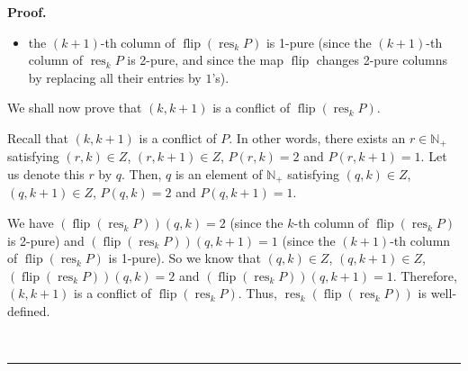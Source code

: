 \documentclass[numbers=enddot,12pt,final,onecolumn,notitlepage]{scrartcl}%
\theoremstyle{definition}
\newenvironment{proof}[1][Proof]{\noindent\textbf{#1.} }{\ \rule{0.5em}{0.5em}}
\newenvironment{verlong}{}{}
\begin{document}
\begin{verlong}
\begin{proof}
\begin{itemize}
\item the $\left(  k+1\right)  $-th column of $\operatorname*{flip}\left(
\operatorname*{res}\nolimits_{k}P\right)  $ is 1-pure (since the $\left(
k+1\right)  $-th column of $\operatorname*{res}\nolimits_{k}P$ is 2-pure, and
since the map $\operatorname*{flip}$ changes 2-pure columns by replacing all
their entries by $1$'s).
\end{itemize}

We shall now prove that $\left(  k,k+1\right)  $ is a conflict of
$\operatorname*{flip}\left(  \operatorname*{res}\nolimits_{k}P\right)  $.

Recall that $\left(  k,k+1\right)  $ is a conflict of $P$. In other words,
there exists an $r\in\mathbb{N}_{+}$ satisfying $\left(  r,k\right)  \in Z$,
$\left(  r,k+1\right)  \in Z$, $P\left(  r,k\right)  =2$ and $P\left(
r,k+1\right)  =1$. Let us denote this $r$ by $q$. Then, $q$ is an element of
$\mathbb{N}_{+}$ satisfying $\left(  q,k\right)  \in Z$, $\left(
q,k+1\right)  \in Z$, $P\left(  q,k\right)  =2$ and $P\left(  q,k+1\right)
=1$.

We have $\left(  \operatorname*{flip}\left(  \operatorname*{res}%
\nolimits_{k}P\right)  \right)  \left(  q,k\right)  =2$ (since the $k$-th
column of $\operatorname*{flip}\left(  \operatorname*{res}\nolimits_{k}%
P\right)  $ is 2-pure) and $\left(  \operatorname*{flip}\left(
\operatorname*{res}\nolimits_{k}P\right)  \right)  \left(  q,k+1\right)  =1$
(since the $\left(  k+1\right)  $-th column of $\operatorname*{flip}\left(
\operatorname*{res}\nolimits_{k}P\right)  $ is 1-pure). So we know that
$\left(  q,k\right)  \in Z$, $\left(  q,k+1\right)  \in Z$, $\left(
\operatorname*{flip}\left(  \operatorname*{res}\nolimits_{k}P\right)  \right)
\left(  q,k\right)  =2$ and $\left(  \operatorname*{flip}\left(
\operatorname*{res}\nolimits_{k}P\right)  \right)  \left(  q,k+1\right)  =1$.
Therefore, $\left(  k,k+1\right)  $ is a conflict of $\operatorname*{flip}%
\left(  \operatorname*{res}\nolimits_{k}P\right)  $. Thus,
$\operatorname*{res}\nolimits_{k}\left(  \operatorname*{flip}\left(
\operatorname*{res}\nolimits_{k}P\right)  \right)  $ is well-defined.


\end{proof}
\end{verlong}
\end{document}
